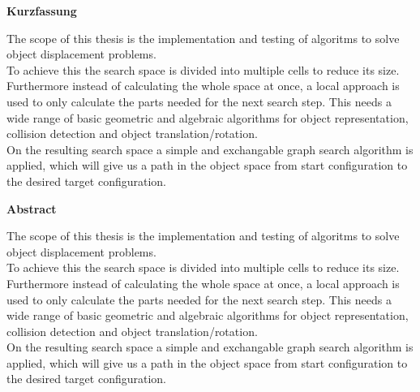 




\pagestyle{headings}


\centerline{\bf Kurzfassung}



%
\vskip 2cm
%


The scope of this thesis is the implementation and testing of algoritms to solve object displacement problems.\\
To achieve this the search space is divided into multiple cells to reduce its size. Furthermore instead of calculating the whole space at once, a local approach is used to only calculate the parts needed for the next search step. This needs a wide range of basic geometric and algebraic algorithms for object representation, collision detection and object translation/rotation.\\
On the resulting search space a simple and exchangable graph search algorithm is applied, which will give us a path in the object space from
start configuration to the desired target configuration.

%
\vskip 4cm
%
\centerline{\bf Abstract}



%
\vskip 2cm
%


The scope of this thesis is the implementation and testing of algoritms to solve object displacement problems.\\
To achieve this the search space is divided into multiple cells to reduce its size. Furthermore instead of calculating the whole space at once, a local approach is used to only calculate the parts needed for the next search step. This needs a wide range of basic geometric and algebraic algorithms for object representation, collision detection and object translation/rotation.\\
On the resulting search space a simple and exchangable graph search algorithm is applied, which will give us a path in the object space from
start configuration to the desired target configuration.